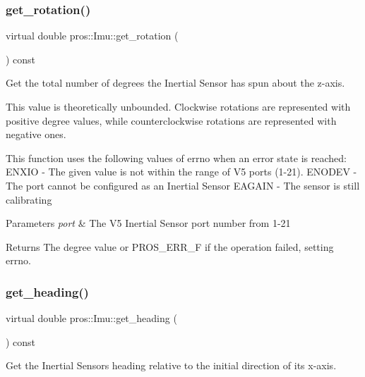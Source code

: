 \subsubsection{\texorpdfstring{get\+\_\+rotation()}{get\_rotation()}}
{\footnotesize\ttfamily virtual double pros\+::\+Imu\+::get\+\_\+rotation (\begin{DoxyParamCaption}{ }\end{DoxyParamCaption}) const\hspace{0.3cm}{\ttfamily [virtual]}}



Get the total number of degrees the Inertial Sensor has spun about the z-\/axis. 

This value is theoretically unbounded. Clockwise rotations are represented with positive degree values, while counterclockwise rotations are represented with negative ones.

This function uses the following values of errno when an error state is reached\+: E\+N\+X\+IO -\/ The given value is not within the range of V5 ports (1-\/21). E\+N\+O\+D\+EV -\/ The port cannot be configured as an Inertial Sensor E\+A\+G\+A\+IN -\/ The sensor is still calibrating


\begin{DoxyParams}{Parameters}
{\em port} & The V5 Inertial Sensor port number from 1-\/21 \\
\hline
\end{DoxyParams}
\begin{DoxyReturn}{Returns}
The degree value or P\+R\+O\+S\+\_\+\+E\+R\+R\+\_\+F if the operation failed, setting errno. 
\end{DoxyReturn}
\mbox{\label{classpros_1_1Imu_a35c7953c5def3c034763af25c4dbebe3}} 
\subsubsection{\texorpdfstring{get\+\_\+heading()}{get\_heading()}}
{\footnotesize\ttfamily virtual double pros\+::\+Imu\+::get\+\_\+heading (\begin{DoxyParamCaption}{ }\end{DoxyParamCaption}) const\hspace{0.3cm}{\ttfamily [virtual]}}



Get the Inertial Sensor\textquotesingle{}s heading relative to the initial direction of its x-\/axis. 


